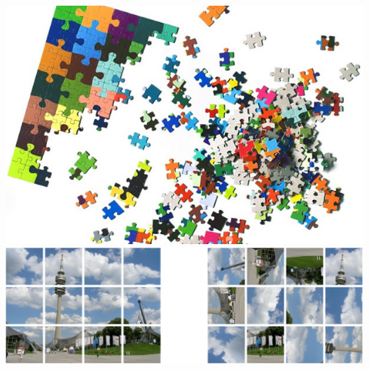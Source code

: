 \documentclass{article}
\begin{document}
    \includegraphics[height=0.3\columnwidth]{pictures/real_puzzle.jpg}
    \newline
    \includegraphics[height=0.3\columnwidth]{pictures/digital_puzzle.png}
\end{document}
